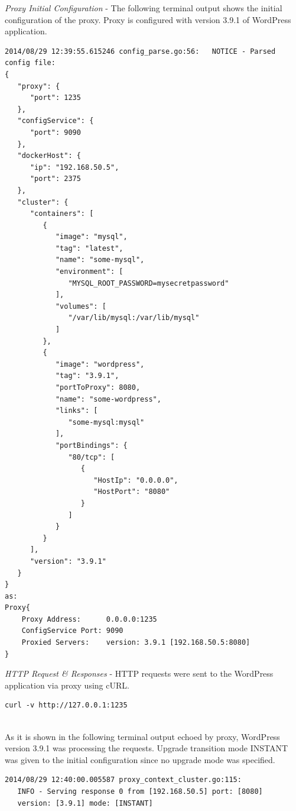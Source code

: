 \documentclass[a4paper,11pt,twoside]{report}
\begin{document}
\noindent
\textit{Proxy Initial Configuration} - The following terminal output shows the initial configuration of the proxy. Proxy is configured with version 3.9.1 of WordPress application.\smallskip

\begin{lstlisting}[language=terminal]
2014/08/29 12:39:55.615246 config_parse.go:56:   NOTICE - Parsed config file:
{
   "proxy": {
      "port": 1235
   },
   "configService": {
      "port": 9090
   },
   "dockerHost": {
      "ip": "192.168.50.5",
      "port": 2375
   },
   "cluster": {
      "containers": [
         {
            "image": "mysql",
            "tag": "latest",
            "name": "some-mysql",
            "environment": [
               "MYSQL_ROOT_PASSWORD=mysecretpassword"
            ],
            "volumes": [
               "/var/lib/mysql:/var/lib/mysql"
            ]
         },
         {
            "image": "wordpress",
            "tag": "3.9.1",
            "portToProxy": 8080,
            "name": "some-wordpress",
            "links": [
               "some-mysql:mysql"
            ],
            "portBindings": {
               "80/tcp": [
                  {
                     "HostIp": "0.0.0.0",
                     "HostPort": "8080"
                  }
               ]
            }
         }
      ],
      "version": "3.9.1"
   }
}
as:
Proxy{
    Proxy Address:      0.0.0.0:1235
    ConfigService Port: 9090
    Proxied Servers:    version: 3.9.1 [192.168.50.5:8080]
}
\end{lstlisting}  

\noindent
\textit{HTTP Request \& Responses} - HTTP requests were sent to the WordPress application via proxy using cURL.
\begin{lstlisting}[language=terminal]
curl -v http://127.0.0.1:1235
\end{lstlisting}  

\noindent\\
As it is shown in the following terminal output echoed by proxy, WordPress version 3.9.1 was processing the requests. Upgrade transition mode INSTANT was given to the initial configuration since no upgrade mode was specified. \smallskip

\begin{lstlisting}[language=terminal]
2014/08/29 12:40:00.005587 proxy_context_cluster.go:115:     
   INFO - Serving response 0 from [192.168.50.5] port: [8080] 
   version: [3.9.1] mode: [INSTANT]
\end{lstlisting}  
\end{document}
